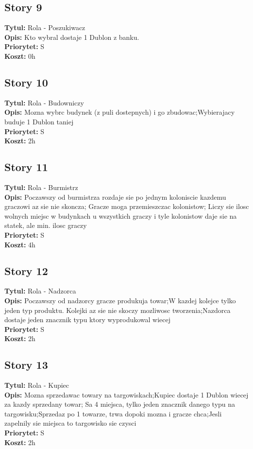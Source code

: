 \documentclass[12pt]{article}
\begin{document}
\subsection{Story 9}
\textbf{Tytul:} Rola - Poszukiwacz \\
\textbf{Opis:} Kto wybral dostaje 1 Dublon z banku. \\
\textbf{Priorytet:} S \\
\textbf{Koszt:} 0h \\

\subsection{Story 10}
\textbf{Tytul:} Rola - Budowniczy \\
\textbf{Opis:} Mozna wybrc budynek (z puli dostepnych) i go zbudowac;Wybierajacy
buduje 1 Dublon taniej\\
\textbf{Priorytet:} S \\
\textbf{Koszt:} 2h \\

\subsection{Story 11}
\textbf{Tytul:} Rola - Burmistrz \\
\textbf{Opis:} Poczawszy od burmistrza rozdaje sie po jednym koloniscie kazdemu
graczowi az sie nie skoncza; Gracze moga przemieszczac kolonistow; Liczy sie
ilosc wolnych miejsc w budynkach u wszystkich graczy i tyle kolonistow daje sie
na statek, ale min. ilosc graczy\\
\textbf{Priorytet:} S \\
\textbf{Koszt:} 4h \\

\subsection{Story 12 }
\textbf{Tytul:} Rola - Nadzorca \\
\textbf{Opis:} Poczawszy od nadzorcy gracze produkuja towar;W kazdej kolejce
tylko jeden typ produktu. Kolejki az sie nie skoczy mozliwosc tworzenia;Nazdorca
dostaje jeden znacznik typu ktory wyprodukowal wiecej\\
\textbf{Priorytet:} S \\
\textbf{Koszt:} 2h \\

\subsection{Story 13}
\textbf{Tytul:} Rola - Kupiec \\
\textbf{Opis:} Mozna sprzedawac towary na targowiskach;Kupiec dostaje 1 Dublon
wiecej za kazdy sprzedany towar; Sa 4 miejsca, tylko jeden znacznik danego typu
na targowisku;Sprzedaz po 1 towarze, trwa dopoki mozna i gracze chca;Jesli
zapelnily sie miejsca to targowisko sie czysci \\
\textbf{Priorytet:} S \\
\textbf{Koszt:} 2h \\
\end{document}
